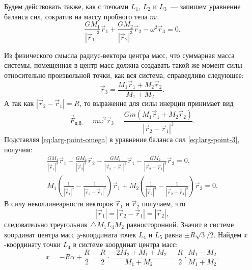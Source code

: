 Будем действовать также, как с точками $L_1$, $L_2$ и $L_3$~--- запишем уравнение баланса сил, сократив на массу пробного тела $m$:
\begin{equation}
	\frac{G M_1}{\left|\vec{r}_1 \right|^3 } \vec{r}_1 + \frac{G M_2}{\left| \vec{r}_2 \right|^3} \vec{r}_2 - \omega^2 \vec{r}_3 = 0.
	\label{eq:larg-point-3}
\end{equation}

Из физического смысла радиус-вектора центра масс, что суммарная масса системы, помещенная в центр масс должна создавать такой же момент силы относительно произвольной точки, как вся система, справедливо следующее:
\begin{equation*}
	\vec{r}_3 = \frac{M_1 \vec{r}_1 + M_2 \vec{r}_2}{M_1 + M_2}.
	\label{eq:larg-point-r_3}
\end{equation*}
А так как $| \vec{r}_2 - \vec{r}_1| = R$, то выражение для силы инерции принимает вид
\begin{equation}
	\vec{F}_\text{ц.б.} = m \omega^2 \vec{r}_3 = \frac{ G m (M_1 \vec{r}_1 + M_2 \vec{r}_2)}{\left| \vec{r}_2 - \vec{r}_1 \right|^3}.
	\label{eq:larg-point-omega}
\end{equation}
Подставляя \eqref{eq:larg-point-omega} в уравнение баланса сил \eqref{eq:larg-point-3}, получим:
\begin{gather*}
	\frac{G M_1}{\left|\vec{r}_1 \right|^3 } \vec{r}_1 + \frac{G M_2}{\left| \vec{r}_2 \right|^3} \vec{r}_2 - \frac{G M_1}{\left|\vec{r}_2 - \vec{r}_1 \right|^3 } \vec{r}_1 - \frac{G M_2}{\left| \vec{r}_2 - \vec{r}_1 \right|^3} \vec{r}_2 = 0,\\
	M_1 \left(\frac{1}{\left| \vec{r}_1 \right|^3} - \frac{1}{\left|\vec{r}_2 - \vec{r}_1 \right|^3} \right) \vec{r}_1 + M_2 \left(\frac{1}{\left| \vec{r}_2 \right|^3} - \frac{1}{\left|\vec{r}_2 - \vec{r}_1 \right|^3} \right) \vec{r}_2 = 0.
\end{gather*}
В силу неколлинеарности векторов $\vec{r}_1$ и $\vec{r}_2$ получаем, что
\begin{equation}
	|\vec{r}_1| = |\vec{r}_2 - \vec{r}_1 | = |\vec{r}_2|,
\end{equation}
следовательно треугольник $\triangle M_1 L_4 M_2$ равносторонний. Значит в системе координат центра масс $y$-координата точек $L_4$ и $L_5$ равна $\pm R\sqrt{3}/2$. Найдем $x$-координату точки $L_4$ в системе координат центра масс:
\begin{equation*}
	x = -R\alpha + \frac{R}{2} = \frac{R}{2} \cdot \frac{-2 M_2 + M_1 + M_2}{M_1 + M_2} = \frac{R}{2} \cdot \frac{M_1 - M_2}{M_1 + M_2}.
\end{equation*}
